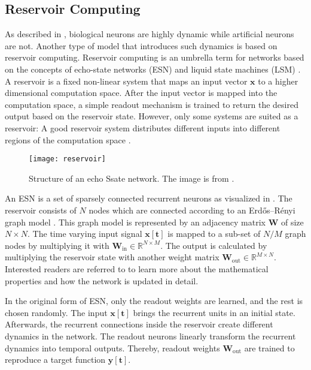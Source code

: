 \subsection{Reservoir Computing}
As described in , biological neurons are highly dynamic while artificial neurons are not.
Another type of model that introduces such dynamics is based on reservoir computing.
Reservoir computing is an umbrella term for networks based on the concepts of echo-state networks (ESN)  and liquid state machines (LSM) .
A reservoir is a fixed non-linear system that maps an input vector \(\boldsymbol{x}\) to a higher dimensional computation space.
After the input vector is mapped into the computation space, a simple readout mechanism is trained to return the desired output based on the reservoir state.
However, only some systems are suited as a reservoir:
A good reservoir system distributes different inputs into different regions of the computation space .
%
\begin{figure}[h]
    \centering
    \texttt{[image: reservoir]}
    \caption[Structure of an echo state network]{Structure of an echo Ssate network. The image is from .}
\end{figure}
%
An ESN is a set of sparsely connected recurrent neurons as visualized in .
The reservoir consists of \(N\) nodes which are connected according to an Erdős–Rényi graph model .
This graph model is represented by an adjacency matrix \(\boldsymbol{W}\) of size \(N \times N\).
The time varying input signal \(\boldsymbol{x[t]}\) is mapped to a sub-set of \(N/M\) graph nodes by multiplying it with \(\boldsymbol{W}_{\text{in}} \in \mathbb{R}^{N\times M}\).
The output is calculated by multiplying the reservoir state with another weight matrix \(\boldsymbol{W}_{\text{out}} \in \mathbb{R}^{M\times N}\).
Interested readers are referred to  to learn more about the mathematical properties and how the network is updated in detail.

In the original form of ESN, only the readout weights are learned, and the rest is chosen randomly.
The input \(\boldsymbol{x[t]}\) brings the recurrent units in an initial state.
Afterwards, the recurrent connections inside the reservoir create different dynamics in the network.
The readout neurons linearly transform the recurrent dynamics into temporal outputs.
Thereby, readout weights \(\boldsymbol{W}_{\text{out}}\) are trained to reproduce a target function \(\boldsymbol{y[t]}\).

